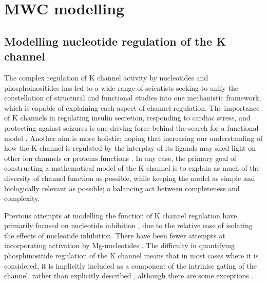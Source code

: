 \chapter{\label{ch:4}MWC modelling} 

\graphicspath{{figures/ch4/}}

\minitoc

\section{Modelling nucleotide regulation of the K\ATP{} channel}

The complex regulation of K\ATP{} channel activity by nucleotides and phosphoinositides has led to a wide range of scientists seeking to unify the constellation of structural and functional studies into one mechanistic framework, which is capable of explaining each aspect of channel regulation.
The importance of K\ATP{} channels in regulating insulin secretion, responding to cardiac stress, and protecting against seizures is one driving force behind the search for a functional model \cite{proks_modeling_2009}.
Another aim is more holistic; hoping that increasing our understanding of how the K\ATP{} channel is regulated by the interplay of its ligands may shed light on other ion channels or proteins functions \cite{garfinkel_alan_modeling_2017}.
In any case, the primary goal of constructing a mathematical model of the K\ATP{} channel is to explain as much of the diversity of channel function as possible, while keeping the model as simple and biologically relevant as possible; a balancing act between completeness and complexity.

Previous attempts at modelling the function of K\ATP{} channel regulation have primarily focused on nucleotide inhibition \cite{trapp_molecular_1998, enkvetchakul_kinetic_2000, markworth_atp4-_2000, ribalet_regulation_2000, enkvetchakul_atp_2001-1, drain_concerted_2004, proks_gating_2005, li_ligand-dependent_2005, ribalet_atp-sensitive_2006-1, craig_how_2008-1}, due to the relative ease of isolating the effects of nucleotide inhibition.
There have been fewer attempts at incorporating activation by Mg-nucleotides \cite{ribalet_regulation_2000, proks_activation_2010-1, vedovato_nucleotide-binding_2015}.
The difficulty in quantifying phosphinositide regulation of the K\ATP{} channel means that in most cases where it is considered, it is implicitly included as a component of the intrinisc gating of the channel, rather than explicitly described \cite{baukrowitz_pip2_1998, fan_phosphoinositides_1999, enkvetchakul_kinetic_2000}, although there are some exceptions \cite{ribalet_regulation_2000, enkvetchakul_atp_2001-1, enkvetchakul_gating_2003}.

